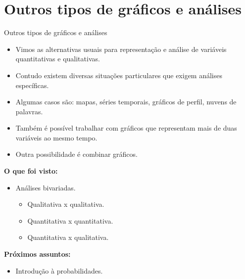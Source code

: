 \documentclass[
  ignorenonframetext,
  serif,
  professionalfont,
  usenames,
  dvipsnames,
  aspectratio = 169]{beamer}
\providecommand{\tightlist}{%
  \setlength{\itemsep}{0pt}\setlength{\parskip}{0pt}}
\renewcommand{\tightlist}{%
  \setlength{\itemsep}{0\baselineskip}
  \setlength{\parskip}{0.25\baselineskip}
}
\def\beginAHalfColumn{\begin{minipage}{0.49\textwidth}}%
\def\endColumns{\end{minipage}}%
\begin{document}
\hypertarget{outros-tipos-de-gruxe1ficos-e-anuxe1lises}{%
\section{Outros tipos de gráficos e
análises}\label{outros-tipos-de-gruxe1ficos-e-anuxe1lises}}

\begin{frame}{Outros tipos de gráficos e análises}
\protect\hypertarget{outros-tipos-de-gruxe1ficos-e-anuxe1lises-1}{}
\beginAHalfColumn

\begin{itemize}
\item
  Vimos as alternativas usuais para representação e análise de variáveis
  quantitativas e qualitativas.
\item
  Contudo existem diversas situações particulares que exigem análises
  específicas.
\end{itemize}

\endColumns
\beginAHalfColumn

\begin{itemize}
\item
  Algumas casos são: mapas, séries temporais, gráficos de perfil, nuvens
  de palavras.
\item
  Também é possível trabalhar com gráficos que representam mais de duas
  variáveis ao mesmo tempo.
\item
  Outra possibilidade é combinar gráficos.
\end{itemize}

\endColumns
\end{frame}

\begin{frame}{}
\protect\hypertarget{section}{}
\beginAHalfColumn

\textbf{O que foi visto:}

\begin{itemize}
\tightlist
\item
  Análises bivariadas.

  \begin{itemize}
  \tightlist
  \item
    Qualitativa x qualitativa.
  \item
    Quantitativa x quantitativa.
  \item
    Quantitativa x qualitativa.
  \end{itemize}
\end{itemize}

\endColumns
\beginAHalfColumn

\textbf{Próximos assuntos:}

\begin{itemize}
\tightlist
\item
  Introdução à probabilidades.
\end{itemize}

\endColumns
\end{frame}
\end{document}
